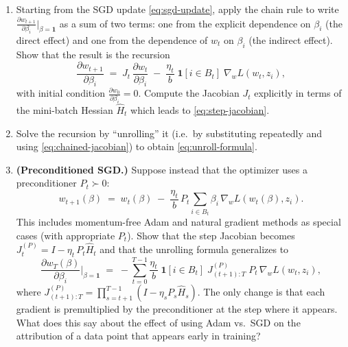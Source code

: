 \documentclass[11pt]{article}
\begin{document}
\begin{exercise}\label{ex:unroll-derive}
\begin{enumerate}
  \item\label{ex:unroll-derive-a} Starting from the SGD update \eqref{eq:sgd-update}, apply the chain rule to write $\tfrac{\partial w_{t+1}}{\partial \beta_i}\big|_{\beta=\mathbf{1}}$ as a sum of two terms: one from the explicit dependence on $\beta_i$ (the direct effect) and one from the dependence of $w_t$ on $\beta_i$ (the indirect effect). Show that the result is the recursion
  \[
    \frac{\partial w_{t+1}}{\partial \beta_i} \;=\; J_t\,\frac{\partial w_t}{\partial \beta_i} \;-\; \frac{\eta_t}{b}\;\mathbf{1}[i\in B_t]\;\nabla_w L(w_t,z_i),
  \]
  with initial condition $\tfrac{\partial w_0}{\partial \beta_i} = 0$. Compute the Jacobian $J_t$ explicitly in terms of the mini-batch Hessian $\widehat{H}_t$ which leads to \eqref{eq:step-jacobian}.
  \item Solve the recursion by ``unrolling'' it (i.e.\ by substituting repeatedly and using \eqref{eq:chained-jacobian}) to obtain \eqref{eq:unroll-formula}.
  \item \textbf{(Preconditioned SGD.)} Suppose instead that the optimizer uses a preconditioner $P_t \succ 0$:
  \begin{equation}\label{eq:precond-update}
    w_{t+1}(\beta) \;=\; w_t(\beta) \;-\; \frac{\eta_t}{b}\,P_t\sum_{i\in B_t}\beta_i\,\nabla_w L(w_t(\beta),z_i).
  \end{equation}
  This includes momentum-free Adam and natural gradient methods as special cases (with appropriate $P_t$). Show that the step Jacobian becomes $J_t^{(P)} = I - \eta_t\,P_t\widehat{H}_t$ and that the unrolling formula generalizes to
  \begin{equation}\label{eq:unroll-precond}
    \frac{\partial w_T(\beta)}{\partial \beta_i}\bigg\rvert_{\beta=\mathbf{1}} \;=\; -\sum_{t=0}^{T-1}\frac{\eta_t}{b}\;\mathbf{1}[i\in B_t]\;J_{(t+1):T}^{(P)}\;P_t\,\nabla_w L(w_t,z_i),
  \end{equation}
  where $J_{(t+1):T}^{(P)} = \prod_{s=t+1}^{T-1}(I - \eta_s P_s\widehat{H}_s)$. The only change is that each gradient is premultiplied by the preconditioner at the step where it appears. What does this say about the effect of using Adam vs.\ SGD on the attribution of a data point that appears early in training?
\end{enumerate}
\end{exercise}
\end{document}
